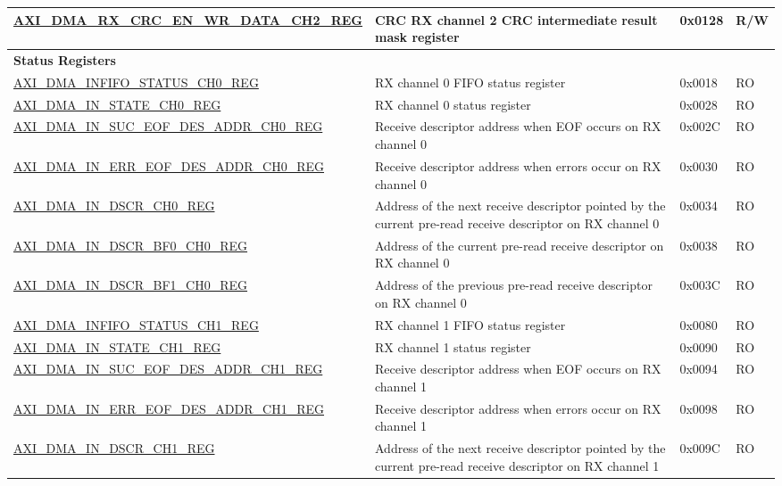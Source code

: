 \begin{longtable}{ | l | p{10cm} | p{1.3cm} | l | }
\hyperref[regdesc:AXIDMARXCRCENWRDATACHNREG]{AXI\_DMA\_RX\_CRC\_EN\_WR\_DATA\_CH2\_REG} & CRC RX channel 2 CRC intermediate result mask register & 0x0128 & R/W \\ \hline
\multicolumn{4}{|l|}{\textbf{Status Registers}} \\ \hline
\hyperref[regdesc:AXIDMAINFIFOSTATUSCHNREG]{AXI\_DMA\_INFIFO\_STATUS\_CH0\_REG} & RX channel 0 FIFO status register & 0x0018 & RO \\ \hline
\hyperref[regdesc:AXIDMAINSTATECHNREG]{AXI\_DMA\_IN\_STATE\_CH0\_REG} & RX channel 0 status register & 0x0028 & RO \\ \hline
\hyperref[regdesc:AXIDMAINSUCEOFDESADDRCHNREG]{AXI\_DMA\_IN\_SUC\_EOF\_DES\_ADDR\_CH0\_REG} & Receive descriptor address when EOF occurs on RX channel 0 & 0x002C & RO \\ \hline
\hyperref[regdesc:AXIDMAINERREOFDESADDRCHNREG]{AXI\_DMA\_IN\_ERR\_EOF\_DES\_ADDR\_CH0\_REG} & Receive descriptor address when errors occur on RX channel 0 & 0x0030 & RO \\ \hline
\hyperref[regdesc:AXIDMAINDSCRCHNREG]{AXI\_DMA\_IN\_DSCR\_CH0\_REG} & Address of the next receive descriptor pointed by the current pre-read receive descriptor on RX channel 0 & 0x0034 & RO \\ \hline
\hyperref[regdesc:AXIDMAINDSCRBF0CHNREG]{AXI\_DMA\_IN\_DSCR\_BF0\_CH0\_REG} & Address of the current pre-read receive descriptor on RX channel 0 & 0x0038 & RO \\ \hline
\hyperref[regdesc:AXIDMAINDSCRBF1CHNREG]{AXI\_DMA\_IN\_DSCR\_BF1\_CH0\_REG} & Address of the previous pre-read receive descriptor on RX channel 0 & 0x003C & RO \\ \hline
\hyperref[regdesc:AXIDMAINFIFOSTATUSCHNREG]{AXI\_DMA\_INFIFO\_STATUS\_CH1\_REG} & RX channel 1 FIFO status register & 0x0080 & RO \\ \hline
\hyperref[regdesc:AXIDMAINSTATECHNREG]{AXI\_DMA\_IN\_STATE\_CH1\_REG} & RX channel 1 status register & 0x0090 & RO \\ \hline
\hyperref[regdesc:AXIDMAINSUCEOFDESADDRCHNREG]{AXI\_DMA\_IN\_SUC\_EOF\_DES\_ADDR\_CH1\_REG} & Receive descriptor address when EOF occurs on RX channel 1 & 0x0094 & RO \\ \hline
\hyperref[regdesc:AXIDMAINERREOFDESADDRCHNREG]{AXI\_DMA\_IN\_ERR\_EOF\_DES\_ADDR\_CH1\_REG} & Receive descriptor address when errors occur on RX channel 1 & 0x0098 & RO \\ \hline
\hyperref[regdesc:AXIDMAINDSCRCHNREG]{AXI\_DMA\_IN\_DSCR\_CH1\_REG} & Address of the next receive descriptor pointed by the current pre-read receive descriptor on RX channel 1 & 0x009C & RO \\ \hline

\end{longtable}

